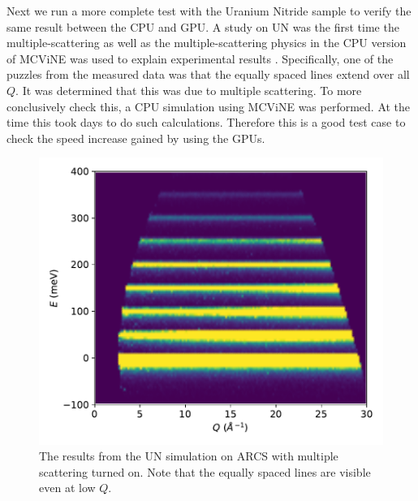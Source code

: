 Next we run a more complete test with the Uranium Nitride sample to verify the same result between the CPU and GPU.
A study on UN was the first time the multiple-scattering as well as the multiple-scattering physics in the CPU version of MCViNE was used to explain experimental results \cite{lin2014UN}. Specifically, one of the puzzles from the measured data was that the equally spaced lines extend over all $Q$.  It was determined that this was due to multiple scattering. 
To more conclusively check this, a CPU simulation using MCViNE was performed\cite{lin2014UN}.  At the time this took days to do such calculations.  Therefore this is a good test case to check the speed increase gained by using the GPUs.

\begin{figure}[h]
\centering
\includegraphics[width=\columnwidth]{figures/UN-ARCS-iqe.pdf}
\caption{The results from the UN simulation on ARCS with multiple scattering turned on.  Note that the equally spaced lines are visible even at low $Q$.}
\label{fig:UN_plot}
\end{figure}

